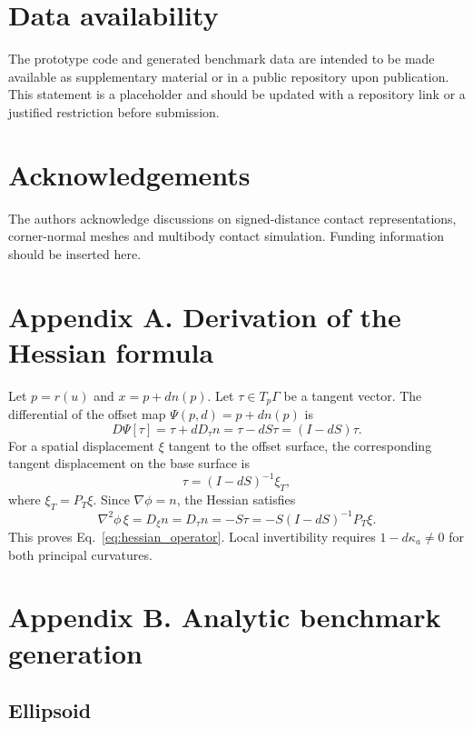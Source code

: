\documentclass[preprint,12pt,sort&compress]{elsarticle}
\begin{document}
\section*{Data availability}
The prototype code and generated benchmark data are intended to be made available as supplementary material or in a public repository upon publication. This statement is a placeholder and should be updated with a repository link or a justified restriction before submission.

\section*{Acknowledgements}
The authors acknowledge discussions on signed-distance contact representations, corner-normal meshes and multibody contact simulation. Funding information should be inserted here.

\appendix

\section{Appendix A. Derivation of the Hessian formula}
\label{app:hessian}

Let $p=r(u)$ and $x=p+d n(p)$. Let $\tau\in T_p\Gamma$ be a tangent vector. The differential of the offset map $\Psi(p,d)=p+d n(p)$ is
\begin{equation}
 D\Psi[\tau] = \tau+dD_\tau n = \tau-dS\tau=(I-dS)\tau.
\end{equation}
For a spatial displacement $\xi$ tangent to the offset surface, the corresponding tangent displacement on the base surface is
\begin{equation}
 \tau=(I-dS)^{-1}\xi_T,
\end{equation}
where $\xi_T=P_T\xi$. Since $\nabla\phi=n$, the Hessian satisfies
\begin{equation}
 \nabla^2\phi\,\xi = D_\xi n = D_\tau n = -S\tau = -S(I-dS)^{-1}P_T\xi.
\end{equation}
This proves Eq.~\eqref{eq:hessian_operator}. Local invertibility requires $1-d\kappa_a\neq0$ for both principal curvatures.

\section{Appendix B. Analytic benchmark generation}
\label{app:benchmarks}

\subsection{Ellipsoid}
\end{document}
